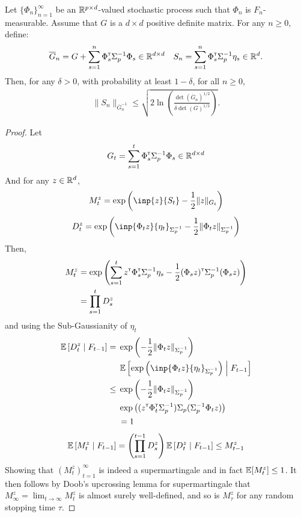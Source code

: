 \begin{subappendices}
\begin{proposition}
		Let $\{\Phi_n\}_{n=1}^\infty$ be an $\mathbb{R}^{p\times d}$-valued stochastic process such that $\Phi_n$ is $F_n$-measurable. Assume that $G$ is a $d\times d$ positive definite matrix. For any $n\geq 0$, define:
		\begin{equation*}
		\overline{G}_n = G + \sum_{s=1}^n \Phi_s^{\mathsf{\scriptscriptstyle T}} \Sigma_p^{-1} \Phi_s \in \mathbb{R}^{d\times d} \quad S_n = \sum_{s=1}^n \Phi_s^{\mathsf{\scriptscriptstyle T}}\Sigma_p^{-1}\eta_s \in \mathbb{R}^{d}.
		\end{equation*}
		Then, for any $\delta>0$, with probability at least $1-\delta$, for all $n\geq0$,
		\begin{align*}
		\| S_n \|_{\overline{G}_n^{-1}} \leq \sqrt{2\ln \left(\frac{\det\left(\overline{G}_n\right)^{1/2}}{\delta\det(G)^{1/2}}\right)}.
		\end{align*}
	\end{proposition}
	\begin{proof}
		Let 
		\begin{equation*}
		G_t = \sum_{s=1}^t \Phi_s^{\mathsf{\scriptscriptstyle T}} \Sigma_p^{-1} \Phi_s \in \mathbb{R}^{d\times d}
		\end{equation*}
		And for any $z\in\mathbb{R}^d$,
		\begin{equation*}
		M_t^z = \exp{\left(\inp{z}{S_t} - \frac{1}{2}\|z\|_{G_t}\right)}
		\end{equation*}
		\begin{equation*}
		D_t^z = \exp{\left(\inp{\Phi_t z}{\eta_t}_{\Sigma_p^{-1}} - \frac{1}{2}\|\Phi_t z\|_{\Sigma_p^{-1}}\right)}
		\end{equation*}
		Then,
		\begin{align*}
		M_t^z &= \exp{\left(\sum_{s=1}^t z^{\mathsf{\scriptscriptstyle T}}\Phi_s^{\mathsf{\scriptscriptstyle T}}\Sigma_p^{-1} \eta_s - \frac{1}{2} (\Phi_s z)^{\mathsf{\scriptscriptstyle T}}\Sigma_p^{-1}(\Phi_s z) \right)} \\
		&= \prod_{s=1}^{t} D_s^z
		\end{align*}
		and using the Sub-Gaussianity of $\eta_t$
		\begin{align*}
		\expectedvalue\left[D_t^z \condbar F_{t-1}\right] = {}& \exp{\left(- \frac{1}{2}\|\Phi_t z\|_{\Sigma_p^{-1}}\right)}\\ &\expectedvalue\left[\exp{\left(\inp{\Phi_t z}{\eta_t}_{\Sigma_p^{-1}}\right)} \condbar F_{t-1}\right]  \\
		\leq {} & \exp{\left(- \frac{1}{2}\|\Phi_t z\|_{\Sigma_p^{-1}}\right)}\\
		&\exp{\left((z^\transp \Phi_t^\transp \Sigma_p^{-1})\Sigma_p(\Sigma_p^{-1} \Phi_t z)\right)}\\
		&= 1
		\end{align*}
		\begin{align*}
		\operatorname*{\mathbb{E}}\left[M_t^z \;\middle|\; F_{t-1}\right] = \left(\prod_{s=1}^{t-1} D_s^z\right) \operatorname*{\mathbb{E}}\left[D_t^z \;\middle|\; F_{t-1}\right] \leq M_{t-1}^z
		\end{align*}
		Showing that $(M_t^z)_{t=1}^\infty$ is indeed a supermartingale and in fact $\operatorname*{\mathbb{E}}[M_t^z]\leq 1$.
		It then follows by Doob's upcrossing lemma for supermartingale that $M_\infty^z = \lim_{t\to\infty} M_t^z$ is almost surely well-defined, and so is $M_\tau^z$ for any random stopping time $\tau$.
		

\end{proof}
\end{subappendices}
